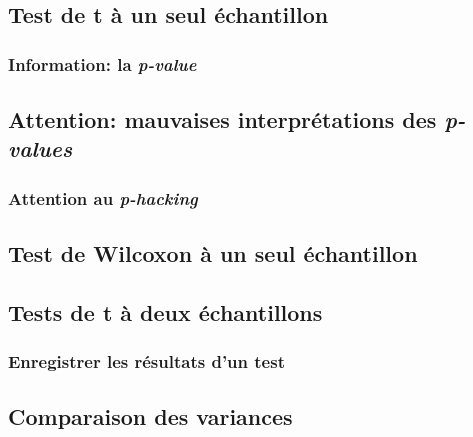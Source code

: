 \documentclass[]{book}
\begin{document}
\hypertarget{test-de-t-uxe0-un-seul-uxe9chantillon}{%
\subsection{Test de t à un seul
échantillon}\label{test-de-t-uxe0-un-seul-uxe9chantillon}}

\hypertarget{information-la-p-value}{%
\subsubsection{\texorpdfstring{Information: la
\emph{p-value}}{Information: la p-value}}\label{information-la-p-value}}

\hypertarget{attention-mauvaises-interpruxe9tations-des-p-values}{%
\subsection{\texorpdfstring{Attention: mauvaises interprétations des
\emph{p-values}}{Attention: mauvaises interprétations des p-values}}\label{attention-mauvaises-interpruxe9tations-des-p-values}}

\hypertarget{attention-au-p-hacking}{%
\subsubsection{\texorpdfstring{Attention au
\emph{p-hacking}}{Attention au p-hacking}}\label{attention-au-p-hacking}}

\hypertarget{test-de-wilcoxon-uxe0-un-seul-uxe9chantillon}{%
\subsection{Test de Wilcoxon à un seul
échantillon}\label{test-de-wilcoxon-uxe0-un-seul-uxe9chantillon}}

\hypertarget{tests-de-t-uxe0-deux-uxe9chantillons}{%
\subsection{Tests de t à deux
échantillons}\label{tests-de-t-uxe0-deux-uxe9chantillons}}

\hypertarget{enregistrer-les-ruxe9sultats-dun-test}{%
\subsubsection{Enregistrer les résultats d'un
test}\label{enregistrer-les-ruxe9sultats-dun-test}}

\hypertarget{comparaison-des-variances}{%
\subsection{Comparaison des variances}\label{comparaison-des-variances}}
\end{document}
